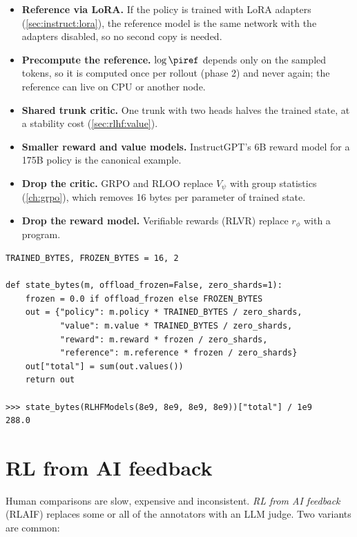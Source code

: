 \begin{systemslens}
\begin{itemize}
  \item \textbf{Reference via LoRA.} If the policy is trained with LoRA adapters (\cref{sec:instruct:lora}),
        the reference model is the same network with the adapters disabled, so no second copy is needed.
  \item \textbf{Precompute the reference.} $\log\piref$ depends only on the sampled tokens, so it is computed
        once per rollout (phase 2) and never again; the reference can live on CPU or another node.
  \item \textbf{Shared trunk critic.} One trunk with two heads halves the trained state, at a
        stability cost (\cref{sec:rlhf:value}).
  \item \textbf{Smaller reward and value models.} InstructGPT's 6B reward model for a 175B policy is the
        canonical example.
  \item \textbf{Drop the critic.} GRPO and RLOO replace $V_\psi$ with group statistics
        (\cref{ch:grpo}), which removes 16 bytes per parameter of trained state.
  \item \textbf{Drop the reward model.} Verifiable rewards (RLVR) replace $r_\phi$ with a program.
\end{itemize}
\end{systemslens}

\begin{lstlisting}[caption={Planning helpers (\ident{llmsys/rlhf/plan.py}).},label={lst:rlhf:plan}]
TRAINED_BYTES, FROZEN_BYTES = 16, 2

def state_bytes(m, offload_frozen=False, zero_shards=1):
    frozen = 0.0 if offload_frozen else FROZEN_BYTES
    out = {"policy": m.policy * TRAINED_BYTES / zero_shards,
           "value": m.value * TRAINED_BYTES / zero_shards,
           "reward": m.reward * frozen / zero_shards,
           "reference": m.reference * frozen / zero_shards}
    out["total"] = sum(out.values())
    return out

>>> state_bytes(RLHFModels(8e9, 8e9, 8e9, 8e9))["total"] / 1e9
288.0
\end{lstlisting}

\section{RL from AI feedback}\label{sec:rlhf:rlaif}

Human comparisons are slow, expensive and inconsistent. \emph{RL from AI feedback} (RLAIF) replaces
some or all of the annotators with an LLM judge. Two variants are common:


